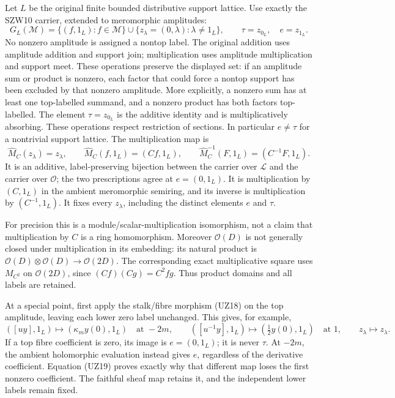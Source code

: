 \documentclass[
  10pt,
  a4paper,
]{article}
\begin{document}
Let \(L\) be the original finite bounded distributive support lattice.
Use exactly the SZW10 carrier, extended to meromorphic amplitudes: \[
G_L(\mathcal M)
=\{(f,1_L):f\in\mathcal M\}
\cup\{z_\lambda=(0,\lambda):\lambda\ne1_L\},\qquad
\tau=z_{0_L},\quad e=z_{1_L}.
\] No nonzero amplitude is assigned a nontop label. The original
addition uses amplitude addition and support join; multiplication uses
amplitude multiplication and support meet. These operations preserve the
displayed set: if an amplitude sum or product is nonzero, each factor
that could force a nontop support has been excluded by that nonzero
amplitude. More explicitly, a nonzero sum has at least one top-labelled
summand, and a nonzero product has both factors top-labelled. The
element \(\tau=z_{0_L}\) is the additive identity and is
multiplicatively absorbing. These operations respect restriction of
sections. In particular \(e\ne\tau\) for a nontrivial support lattice.
The multiplication map is \[
\widehat M_C(z_\lambda)=z_\lambda,\qquad
\widehat M_C(f,1_L)=(Cf,1_L),\qquad
\widehat M_C^{-1}(F,1_L)=(C^{-1}F,1_L).
\tag{UZ44}
\] It is an additive, label-preserving bijection between the carrier
over \(\mathcal L\) and the carrier over \(\mathcal O\); the two
prescriptions agree at \(e=(0,1_L)\). It is multiplication by
\((C,1_L)\) in the ambient meromorphic semiring, and its inverse is
multiplication by \((C^{-1},1_L)\). It fixes every \(z_\lambda\),
including the distinct elements \(e\) and \(\tau\).

For precision this is a module/scalar-multiplication isomorphism, not a
claim that multiplication by \(C\) is a ring homomorphism. Moreover
\(\mathcal O(D)\) is not generally closed under multiplication in its
embedding: its natural product is
\(\mathcal O(D)\otimes\mathcal O(D)\to\mathcal O(2D)\). The
corresponding exact multiplicative square uses \(M_{C^2}\) on
\(\mathcal O(2D)\), since \((Cf)(Cg)=C^2fg\). Thus product domains and
all labels are retained.

At a special point, first apply the stalk/fibre morphism (UZ18) on the
top amplitude, leaving each lower zero label unchanged. This gives, for
example, \[
([u y],1_L)\longmapsto(\kappa_m y(0),1_L)
\quad\text{at }-2m,\qquad
([u^{-1}y],1_L)\longmapsto(\tfrac12y(0),1_L)
\quad\text{at }1,\qquad z_\lambda\longmapsto z_\lambda.
\tag{UZ45}
\] If a top fibre coefficient is zero, its image is \(e=(0,1_L)\); it is
never \(\tau\). At \(-2m\), the ambient holomorphic evaluation instead
gives \(e\), regardless of the derivative coefficient. Equation (UZ19)
proves exactly why that different map loses the first nonzero
coefficient. The faithful sheaf map retains it, and the independent
lower labels remain fixed.
\end{document}
